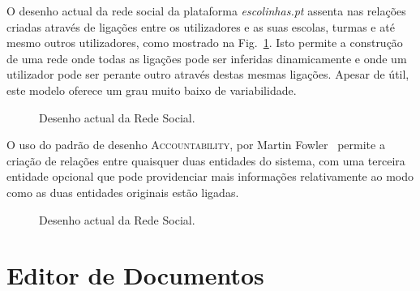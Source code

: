 \documentclass[9pt,a4paper]{extarticle}
\begin{document}
\begin{multicols}{2}
O desenho actual da rede social da plataforma \emph{escolinhas.pt} assenta nas relações criadas através de ligações entre os utilizadores e as suas escolas, turmas e até mesmo outros utilizadores, como mostrado na Fig.~\ref{fig:social_network_current}. Isto permite a construção de uma rede onde todas as ligações pode ser inferidas dinamicamente e onde um utilizador pode ser perante outro através destas mesmas ligações. Apesar de útil, este modelo oferece um grau muito baixo de variabilidade.

\begin{figure}[H]
  \caption{Desenho actual da Rede Social.}
  \label{fig:social_network_current}
\end{figure}


O uso do padrão de desenho \textsc{Accountability}, por Martin Fowler~\cite{fowler_accountability} permite a criação de relações entre quaisquer duas entidades do sistema, com uma terceira entidade opcional que pode providenciar mais informações relativamente ao modo como as duas entidades originais estão ligadas.

\begin{figure}[H]
  \caption{Desenho actual da Rede Social.}
  \label{fig:social_network_conceptual}
\end{figure}

\section{Editor de Documentos}\label{sec:document_editor}


\end{multicols}
\end{document}
